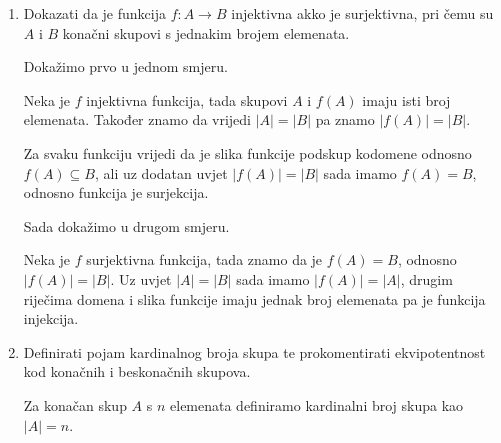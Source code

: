 \documentclass{article}
\begin{document}
\begin{enumerate}
\item Dokazati da je funkcija $f: A \to B$ injektivna akko je surjektivna, pri čemu su $A$ i $B$ konačni skupovi s jednakim brojem elemenata.

Dokažimo prvo u jednom smjeru.

Neka je $f$ injektivna funkcija, tada skupovi $A$ i $f(A)$ imaju isti broj elemenata. Također znamo da vrijedi $|A| = |B|$ pa znamo $|f(A)| = |B|$.

Za svaku funkciju vrijedi da je slika funkcije podskup kodomene odnosno $f(A)\subseteq B$, ali uz dodatan uvjet $|f(A)| = |B|$ sada imamo $f(A) = B$, odnosno funkcija je surjekcija.

Sada dokažimo u drugom smjeru.

Neka je $f$ surjektivna funkcija, tada znamo da je $f(A) = B$, odnosno $|f(A)| = |B|$. Uz uvjet $|A| = |B|$ sada imamo $|f(A)|=|A|$, drugim riječima domena i slika funkcije imaju jednak broj elemenata pa je funkcija injekcija.

\item Definirati pojam kardinalnog broja skupa te prokomentirati ekvipotentnost kod konačnih i beskonačnih skupova.

Za konačan skup $A$ s $n$ elemenata definiramo kardinalni broj skupa kao $|A| = n$.

\end{enumerate}
\end{document}
